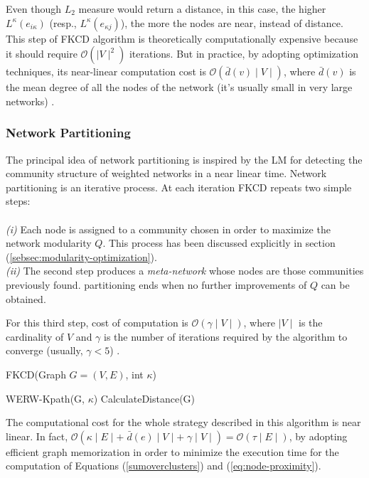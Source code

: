 Even though $L_2$ measure would return a distance, in this case, the higher $L^\kappa (e_{i \kappa})$ (resp., $L^\kappa (e_{\kappa j})$), the more the nodes are near, instead of distance. This step of FKCD algorithm is theoretically computationally expensive because it should require $\mathcal{O} (\mid V \mid^2)$ iterations. But in practice, by adopting optimization techniques, its near-linear computation cost is $\mathcal{O} (\bar{d}(v) \mid V \mid)$, where $\bar{d}(v)$ is the mean degree of all the nodes of the network (it's usually small in very large networks) \cite{ref-28}.

\subsubsection*{Network Partitioning}\label{subsec:network-partitioning}
The principal idea of network partitioning is inspired by the LM \cite{ref-27} for detecting the community structure of weighted networks in a near linear time. Network partitioning is an iterative process. At each iteration FKCD repeats two simple steps:\\\\
\textit{(i)} Each node is assigned to a community chosen in order to maximize the network modularity $Q$. This process has been discussed explicitly in section (\ref{sebsec:modularity-optimization}).\\
\textit{(ii)} The second step produces a \textit{meta-network} whose nodes are those communities previously found.
partitioning ends when no further improvements of $Q$ can be obtained.

For this third step, cost of computation is $\mathcal{O} (\gamma \mid V \mid)$, where $\mid V \mid$ is the cardinality of $V$ and $\gamma$ is the number of iterations required by the algorithm to converge (usually, $\gamma < 5$) \cite{ref-28}.

\begin{algorithm}
	\caption{FKCD(Graph $G = (V, E)$, int $\kappa$)}
	\label{algo:fkcd-algorithm}
	\SetAlgoLined
	\DontPrintSemicolon
	WERW-Kpath(G, $\kappa$)
	CalculateDistance(G)
\end{algorithm}
The computational cost for the whole strategy described in this algorithm is near linear. In fact, $\mathcal{O} (\kappa \mid E \mid + \;\bar{d} (e) \mid V \mid + \;\gamma \mid V \mid) = \mathcal{O} (\tau \mid E \mid)$, by adopting efficient graph memorization in order to minimize the execution time for the computation of Equations (\ref{sumoverclusters}) and (\ref{eq:node-proximity}).

